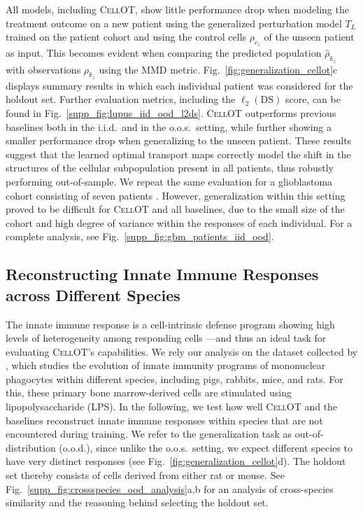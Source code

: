  All models, including \textsc{CellOT}, show little performance drop when modeling the treatment outcome on a new patient using the generalized perturbation model $T_L$ trained on the patient cohort and using the control cells $\rho_{c_z}$ of the unseen patient as input.
This becomes evident when comparing the predicted population $\hat{\rho}_{k_z}$ with observations $\rho_{k_z}$ using the MMD metric. Fig.~\ref{fig:generalization_cellot}c displays summary results in which each individual patient was considered for the holdout set. Further evaluation metrics, including the $\ell_2(\text{DS})$ score, can be found in Fig.~\ref{supp_fig:lupus_iid_ood_l2ds}. \textsc{CellOT} outperforms previous baselines both in the i.i.d.~and in the o.o.s.~setting, while further showing a smaller performance drop when generalizing to the unseen patient.
These results suggest that the learned optimal transport maps correctly model the shift in the structures of the cellular subpopulation present in all patients, thus robustly performing out-of-sample.
We repeat the same evaluation for a glioblastoma cohort consisting of seven patients \citep{zhao2021deconvolution}. However, generalization within this setting proved to be difficult for \textsc{CellOT} and all baselines, due to the small size of the cohort and high degree of variance within the responses of each individual. 
For a complete analysis, see Fig.~\ref{supp_fig:gbm_patients_iid_ood}.

\subsection{Reconstructing Innate Immune Responses across Different Species}

The innate immune response is a cell-intrinsic defense program showing high levels of heterogeneity among responding cells ---and thus an ideal task for evaluating \textsc{CellOT}'s capabilities. We rely our analysis on the dataset collected by \citet{hagai2018gene}, which studies the evolution of innate immunity programs of mononuclear phagocytes within different species, including pigs, rabbits, mice, and rats. For this, these primary bone marrow-derived cells are stimulated using lipopolysaccharide (LPS).
In the following, we test how well \textsc{CellOT} and the baselines reconstruct innate immune responses within species that are not encountered during training. We refer to the generalization task as out-of-distribution (o.o.d.), since unlike the o.o.s.~setting, we expect different species to have very distinct responses (see Fig.~\ref{fig:generalization_cellot}d).
The holdout set thereby consists of cells derived from either rat or mouse. See Fig.~\ref{supp_fig:crossspecies_ood_analysis}a,b for an analysis of cross-species similarity and the reasoning behind selecting the holdout set.

